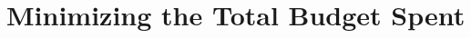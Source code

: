 \documentclass{article}
\begin{document}
\begin{comment}
The justification of this formula is direct: when we are restricted to the $j$ first projects, 
the minimum cost for 
 locally satisfying at least $k$ agent-project pairs is done by locally satisfying at least $b$ agents for project $j$, plus at least $a$ agent-project pairs for projects from $1$ to $j-1$, where $0 \le b \le n$ and $0 \le a \le (j-1)n$.     

Computing an entry $\cost(j,k)$ requires at most $n+1$ elementary operations (one per choice of $b$). In total, $\cost$ has $\frac{m(m+1)}{2}(n+1)$ possible entries. Thus, at most $\frac{m(m+1)}{2}(n+1)^2$ operations are necessary, which is polynomial in $n$ and $m$. 


Once all the entries of $\cost$ are computed, the largest $k^*$ such that $\cost(m,k^*) \le 1$ corresponds to the maximum value taken by $f_{util}$. The associated solution, say ${\bf x}^*$, can be retrieved by standard backtracking techniques that we skip. 
\end{proof}

\end{comment}

\begin{comment}

How bad a utilitarian optimal solution  performs  concerning the number of satisfied agents when $\tau=m/2$? The following example shows that the utilitarian approach cannot beat the {\sc dictator} rule which is guaranteed to cover slightly more than one half of the population (cf. Theorem \ref{thm_dict}).


\begin{example} Suppose there are 5 projects and 20 agents. The first 10 agents declare $1/5$ for every project. The last 10 agents have pairwise distinct declarations: each of them declares $1/3$ for three projects and 0 for the last two. 

The vector $(1/5,1/5,1/5,1/5,1/5)$ maximizes $f_{util}$; 70 project-agent pairs are locally satisfied. This solution satisfies the 10 first agents. The solution $(1/3,1/3,1/3,0,0)$ satisfies all the 20 agents. Thus, the ratio is $1/2$. It is worth noticing that this example can be extended to any odd value of $m$, so that the ratio goes strictly below $1/2$. 
\end{example}

\end{comment}


\section{Minimizing the Total Budget Spent} \label{sec:min_tot_bud}
\end{document}
